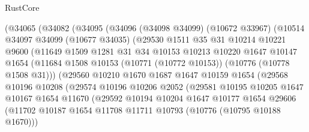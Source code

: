 \begin{lexlean}{RustCore}
\begin{coremodule}
              (@34065
                (@34082
                  (@34095
                    (@34096
                      (@34098 @34099)
                      (@10672 @33967)
                      (@10514
                        @34097
                        @34099
                        (@10677 @34035)
                        (@29530
                          @1511
                          @35
                          @31
                          @10214
                          @10221
                          @9600
                          (@11649
                            @1509
                            @1281
                            @31
                            @34
                            @10153
                            @10213
                            @10220
                            @1647
                            @10147
                            @1654
                            (@11684
                              @1508
                              @10153
                              (@10771 (@10772 @10153))
                              (@10776 (@10778 @1508 @31)))
                            (@29560
                              @10210
                              @1670
                              @1687
                              @1647
                              @10159
                              @1654
                              (@29568
                                @10196
                                @10208
                                (@29574
                                  @10196
                                  @10206
                                  @2052
                                  (@29581
                                    @10195
                                    @10205
                                    @1647
                                    @10167
                                    @1654
                                    @11670
                                    (@29592
                                      @10194
                                      @10204
                                      @1647
                                      @10177
                                      @1654
                                      @29606
                                      (@11702
                                        @10187
                                        @1654
                                        @11708
                                        @11711
                                        @10793
                                        (@10776 (@10795 @10188 @1670)))

\end{coremodule}
\end{lexlean}
